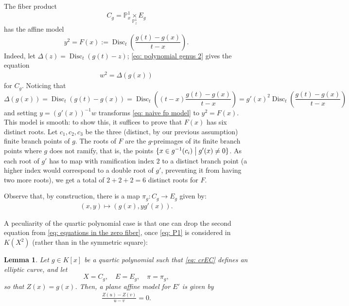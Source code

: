 \documentclass[a4paper,twoside,english]{amsart}
\theoremstyle{plain}
\newtheorem{lemma}[theorem]{Lemma}
\theoremstyle{definition}
\begin{document}
The fiber product 
\begin{equation}\label{eq: polynomial genus 2}
    C_g=\mathbb P^1_x\underset{\mathbb P^1_z}{\times} E_g
\end{equation}
has the affine model
\begin{equation}
y^2=F(x):=\operatorname{Disc}_t\left(\frac{g(t)-g(x)}{t-x}\right).\label{eq: fp reduced}
\end{equation}
Indeed, let $\Delta(z)=\operatorname{Disc}_t(g(t)-z)$; \eqref{eq: polynomial genus 2} gives the equation \begin{align}\label{eq: naive fp model}
    w^2=\Delta(g(x))
\end{align} for $C_g$. Noticing that
\[
\Delta(g(x)) = \operatorname{Disc}_t(g(t)-g(x)) = \operatorname{Disc}_t
\left( (t-x)\frac{g(t)-g(x)}{t-x} \right)=g'(x)^2\operatorname{Disc}_t\left(\frac{g(t)-g(x)}{t-x}\right)
\]
and setting $y=(g'(x))^{-1}w$ transforms \eqref{eq: naive fp model} to $y^2=F(x)$.
This model is smooth: to show this, it suffices to prove that $F(x)$ has six distinct roots. Let $c_1, c_2, c_3$ be the three (distinct, by our previous assumption) finite branch points of $g$. The roots of $F$ are the $g$-preimages of its finite branch points where $g$ does not ramify, that is, the points $\{ x \in g^{-1}(c_i) \bigm\vert g'(x) \neq 0 \}$. As each root of $g'$ has to map with ramification index $2$ to a distinct branch point (a higher index would correspond to a double root of $g'$, preventing it from having two more roots), we get a total of $2+2+2=6$ distinct roots for $F$.

Observe that, by construction, there is a map $\pi_g:C_g\to E_g$ given by:
\begin{align}\label{pi deg 4}
     (x,y) \mapsto (g(x),yg'(x)).
\end{align}



A peculiarity of the quartic polynomial case is that one can drop the second equation from \eqref{eq: equations in the zero fiber}, once \eqref{eq: P1} is considered in $K(X^2)$ (rather than in the symmetric square):

\begin{lemma}
\label{lemma: critical EC}
    Let $g\in K[x]$ be a quartic polynomial such that \eqref{eq: crEC} defines an elliptic curve, and let $$X=C_g, \quad E=E_g, \quad \pi=\pi_g,$$ so that $Z(x)=g(x)$. Then, a plane affine model for $E'$ is given by \begin{align}
          \frac{Z(u) - Z(v)}{u - v} = 0.\label{eq:self-fiber product}
    \end{align}
\end{lemma}
\end{document}
